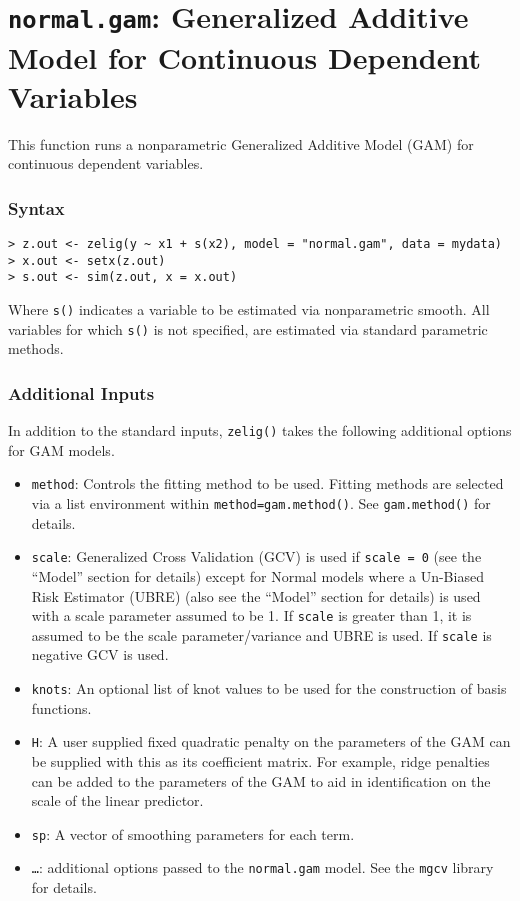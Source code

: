 \section{{\tt normal.gam}: Generalized Additive Model for Continuous Dependent Variables}\label{gam.normal}

This function runs a nonparametric Generalized Additive Model (GAM) for continuous dependent variables. 

\subsubsection{Syntax}
\begin{verbatim}
> z.out <- zelig(y ~ x1 + s(x2), model = "normal.gam", data = mydata) 
> x.out <- setx(z.out)
> s.out <- sim(z.out, x = x.out)
\end{verbatim}
Where {\tt s()} indicates a variable to be estimated via nonparametric smooth. All variables for which  {\tt s()} is not specified, are estimated via standard parametric methods. 

\subsubsection{Additional Inputs}
In addition to the standard inputs, {\tt zelig()} takes the following additional options for GAM models.
\begin{itemize}
\item {\tt method}: Controls the fitting method to be used. Fitting methods are selected via a list environment within {\tt method=gam.method()}. See {\tt gam.method()} for details. 
\item {\tt scale}:  Generalized Cross Validation (GCV) is used if {\tt scale = 0} (see the ``Model'' section for details) except for Normal models where a Un-Biased Risk Estimator (UBRE) (also see the ``Model'' section for details) is used with a scale parameter assumed to be 1. If {\tt scale} is greater than 1, it is assumed to be the scale parameter/variance and UBRE is used. If {\tt scale} is negative GCV is used.
\item {\tt knots}: An optional list of knot values to be used for the construction of basis functions. 
\item {\tt H}: A user supplied fixed quadratic penalty on the parameters of the GAM can be supplied with this as its coefficient matrix. For example, ridge penalties can be added to the parameters of the GAM to aid in identification on the scale of the linear predictor.
\item {\tt sp}: A vector of smoothing parameters for each term.
\item {\tt \ldots}: additional options passed to the {\tt normal.gam} model. See the {\tt mgcv} library for details. 
\end{itemize}


